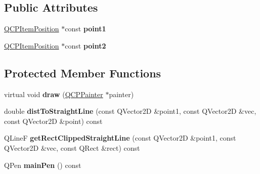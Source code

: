 \subsection*{Public Attributes}
\begin{DoxyCompactItemize}
\item 
\hypertarget{classQCPItemStraightLine_ac131a6ffe456f2cc7364dce541fe0120}{}\hyperlink{classQCPItemPosition}{Q\+C\+P\+Item\+Position} $\ast$const {\bfseries point1}\label{classQCPItemStraightLine_ac131a6ffe456f2cc7364dce541fe0120}

\item 
\hypertarget{classQCPItemStraightLine_ad26c0a732e471f63f75d481dcd48cfc9}{}\hyperlink{classQCPItemPosition}{Q\+C\+P\+Item\+Position} $\ast$const {\bfseries point2}\label{classQCPItemStraightLine_ad26c0a732e471f63f75d481dcd48cfc9}

\end{DoxyCompactItemize}
\subsection*{Protected Member Functions}
\begin{DoxyCompactItemize}
\item 
\hypertarget{classQCPItemStraightLine_a2daa1e1253216c26565d56a2d5530170}{}virtual void {\bfseries draw} (\hyperlink{classQCPPainter}{Q\+C\+P\+Painter} $\ast$painter)\label{classQCPItemStraightLine_a2daa1e1253216c26565d56a2d5530170}

\item 
\hypertarget{classQCPItemStraightLine_adc9b6c5bd33c7f806b748b79dfa25926}{}double {\bfseries dist\+To\+Straight\+Line} (const Q\+Vector2\+D \&point1, const Q\+Vector2\+D \&vec, const Q\+Vector2\+D \&point) const \label{classQCPItemStraightLine_adc9b6c5bd33c7f806b748b79dfa25926}

\item 
\hypertarget{classQCPItemStraightLine_af18ac29577b5b96fece15b0ffea70177}{}Q\+Line\+F {\bfseries get\+Rect\+Clipped\+Straight\+Line} (const Q\+Vector2\+D \&point1, const Q\+Vector2\+D \&vec, const Q\+Rect \&rect) const \label{classQCPItemStraightLine_af18ac29577b5b96fece15b0ffea70177}

\item 
\hypertarget{classQCPItemStraightLine_a63ef39814c5b560dbb7b13e3fec1d940}{}Q\+Pen {\bfseries main\+Pen} () const \label{classQCPItemStraightLine_a63ef39814c5b560dbb7b13e3fec1d940}

\end{DoxyCompactItemize}
